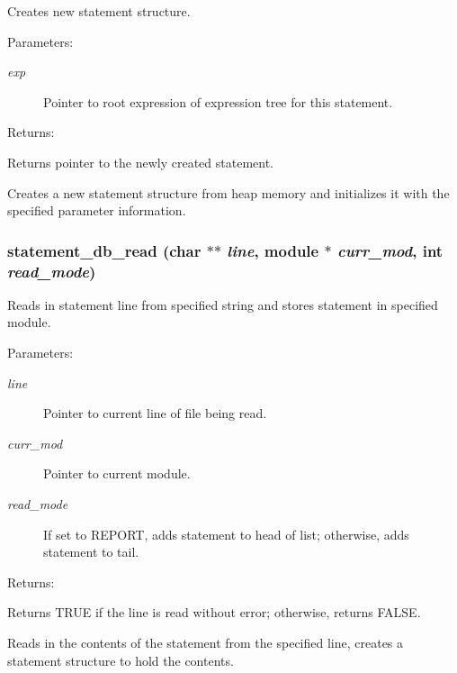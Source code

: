 Creates new statement structure.

\begin{Desc}
\item[Parameters: ]\par
\begin{description}
\item[{\em 
exp}]Pointer to root expression of expression tree for this statement.\end{description}
\end{Desc}
\begin{Desc}
\item[Returns: ]\par
Returns pointer to the newly created statement.\end{Desc}
Creates a new statement structure from heap memory and initializes it with the specified parameter information. 
\subsubsection{ statement\_\-db\_\-read (char $\ast$$\ast$ {\em line}, {\bf module} $\ast$ {\em curr\_\-mod}, int {\em read\_\-mode})}\label{statement_8h_a2}


Reads in statement line from specified string and stores statement in specified module.

\begin{Desc}
\item[Parameters: ]\par
\begin{description}
\item[{\em 
line}]Pointer to current line of file being read. \item[{\em 
curr\_\-mod}]Pointer to current module. \item[{\em 
read\_\-mode}]If set to REPORT, adds statement to head of list; otherwise, adds statement to tail.\end{description}
\end{Desc}
\begin{Desc}
\item[Returns: ]\par
Returns TRUE if the line is read without error; otherwise, returns FALSE.\end{Desc}
Reads in the contents of the statement from the specified line, creates a statement structure to hold the contents. 
